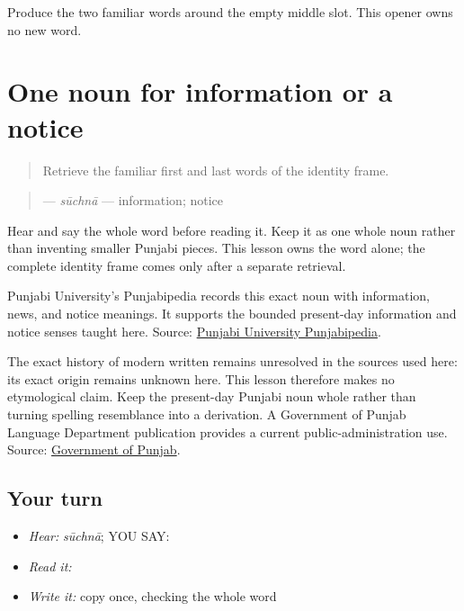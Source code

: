 \begin{tcolorbox}[breakable,colback=teal!4,colframe=teal!35!black,title={Before you move on}]
Produce the two familiar words around the empty middle slot. This opener owns no new word.
\end{tcolorbox}
\section[\texorpdfstring{\pa{ਸੂਚਨਾ} (suchnaa)}{ਸੂਚਨਾ (suchnaa)}]{One noun for information or a notice}

\label{lesson:PA-C199-suchna}



\begin{quote}
Retrieve the familiar first and last words of the identity frame.
\end{quote}

\begin{grammarlens}[title={Grammar Lens: direct owner}]
\begin{quote}
\textbf{} — \emph{sūchnā} — information; notice
\end{quote}

Hear and say the whole word before reading it. Keep it as one whole noun rather than inventing smaller Punjabi pieces. This lesson owns the word alone; the complete identity frame comes only after a separate retrieval.
\end{grammarlens}

\begin{cousinweb}
Punjabi University's Punjabipedia records this exact noun with information, news, and notice meanings. It supports the bounded present-day information and notice senses taught here. Source: \href{https://punjabipedia.org/topic.aspx?txt=\%E0\%A8\%B8\%E0\%A9\%82\%E0\%A8\%9A\%E0\%A8\%A8\%E0\%A8\%BE}{Punjabi University Punjabipedia}.

The exact history of modern written \textbf{} remains unresolved in the sources used here: its exact origin remains unknown here. This lesson therefore makes no etymological claim. Keep the present-day Punjabi noun whole rather than turning spelling resemblance into a derivation. A Government of Punjab Language Department publication provides a current public-administration use. Source: \href{https://punjab.gov.in/wp-content/uploads/2023/02/Language-Department-RTI2023-1.pdf}{Government of Punjab}.
\end{cousinweb}

\subsection*{Your turn}
\begin{itemize}
\raggedright
  \item \emph{Hear:} \emph{sūchnā}; YOU SAY: \textbf{}
  \item \emph{Read it:} \textbf{}
  \item \emph{Write it:} copy \textbf{} once, checking the whole word
\end{itemize}

